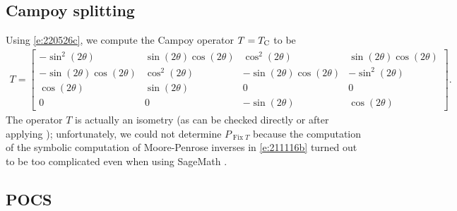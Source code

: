 \documentclass[11pt]{article}
\newcommand{\Fix}{\ensuremath{\operatorname{Fix}}}
\newcommand{\tc}{\ensuremath{T_{\text{\scriptsize C}}}}
\theoremstyle{definition}
\begin{document}
{{\subsection{Campoy splitting}
Using \cref{e:220526c}, we compute the Campoy operator $T=\tc$ to be 
\begin{align*}
T = 
\begin{bmatrix}
-\sin^2(2\theta) 
& \sin(2\theta)\cos(2\theta)
& \cos^2(2\theta)
& \sin(2\theta)\cos(2\theta)\\
- \sin(2\theta)\cos(2\theta)
& \cos^2(2\theta)
& -\sin(2\theta)\cos(2\theta)
& -\sin^2(2\theta) \\
\cos(2\theta) 
& \sin(2\theta) & 0 & 0 \\
0 & 0 & -\sin(2\theta) 
& \cos(2\theta)
\end{bmatrix}.
\end{align*}
The operator $T$ is actually an isometry (as can be checked
directly or after applying \cite[Proposition~3.5]{BC2017});
unfortunately, we could not determine
$P_{\Fix T}$ because the computation of the symbolic computation of
Moore-Penrose inverses in \cref{e:211116b} turned out to be too complicated even when using SageMath \cite{Sage}. 


\subsection{POCS}

}}
\end{document}
